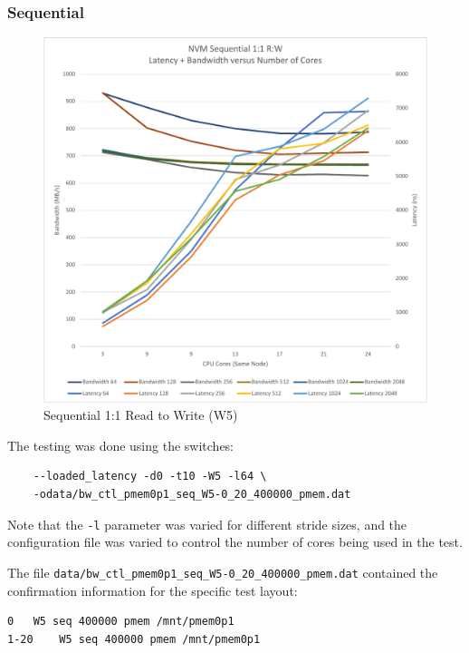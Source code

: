 \subsubsection{Sequential}

\begin{figure}
    \centering
    \caption{Sequential 1:1 Read to Write (W5)}\label{chart:sequential:W5}
    \includegraphics[scale=0.5]{charts/sequential-w5-crop.pdf}
\end{figure}


The testing was done using the switches:

\begin{verbatim}
    --loaded_latency -d0 -t10 -W5 -l64 \
    -odata/bw_ctl_pmem0p1_seq_W5-0_20_400000_pmem.dat
\end{verbatim}

Note that the \verb+-l+ parameter was varied for different
stride sizes, and the configuration file was varied to control
the number of cores being used in the test.

The file \verb+data/bw_ctl_pmem0p1_seq_W5-0_20_400000_pmem.dat+ contained the confirmation information
for the specific test layout:

\begin{verbatim}
0	W5 seq 400000 pmem /mnt/pmem0p1
1-20	W5 seq 400000 pmem /mnt/pmem0p1
\end{verbatim}


